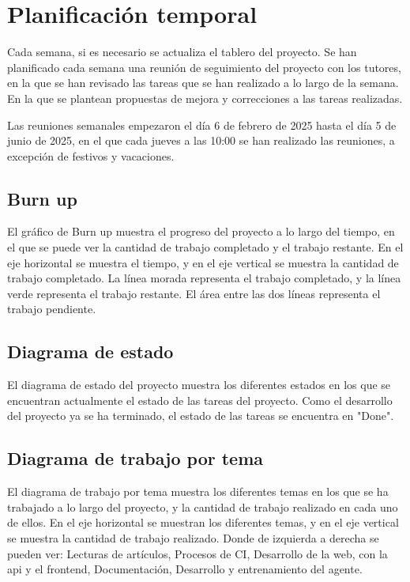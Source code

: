 \section{Planificación temporal}
Cada semana, si es necesario se actualiza el tablero del proyecto.
Se han planificado cada semana una reunión de seguimiento del proyecto con los tutores, en la que se han revisado las tareas que se han realizado a lo largo de la semana. En la que se plantean propuestas de mejora y correcciones a las tareas realizadas.

Las reuniones semanales empezaron el día 6 de febrero de 2025 hasta el día 5 de junio de 2025, en el que cada jueves a las 10:00 se han realizado las reuniones, a excepción de festivos y vacaciones.

\subsection{Burn up}
El gráfico de Burn up muestra el progreso del proyecto a lo largo del tiempo, en el que se puede ver la cantidad de trabajo completado y el trabajo restante. En el eje horizontal se muestra el tiempo, y en el eje vertical se muestra la cantidad de trabajo completado. La línea morada representa el trabajo completado, y la línea verde representa el trabajo restante. El área entre las dos líneas representa el trabajo pendiente.


\subsection{Diagrama de estado}
El diagrama de estado del proyecto muestra los diferentes estados en los que se encuentran actualmente el estado de las tareas del proyecto. Como el desarrollo del proyecto ya se ha terminado, el estado de las tareas se encuentra en "Done".

\subsection{Diagrama de trabajo por tema}
El diagrama de trabajo por tema muestra los diferentes temas en los que se ha trabajado a lo largo del proyecto, y la cantidad de trabajo realizado en cada uno de ellos. En el eje horizontal se muestran los diferentes temas, y en el eje vertical se muestra la cantidad de trabajo realizado.
Donde de izquierda a derecha se pueden ver: Lecturas de artículos,  Procesos de CI, Desarrollo de la web, con la api y el frontend, Documentación, Desarrollo y entrenamiento del agente.

